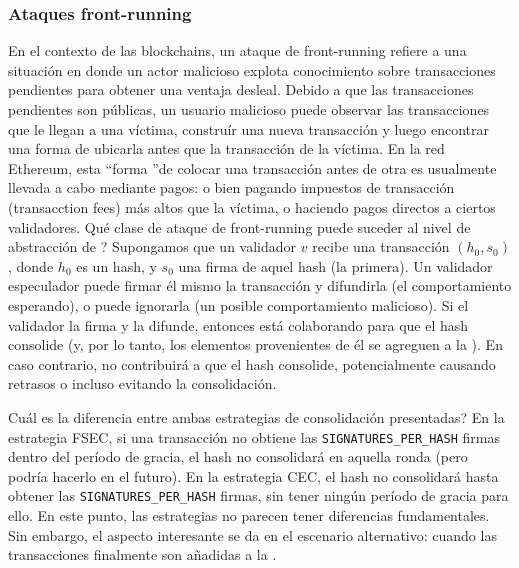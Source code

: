 \subsubsection{Ataques front-running}
En el contexto de las blockchains, un ataque de front-running refiere a una situación en donde
un actor malicioso explota conocimiento sobre transacciones pendientes para obtener una ventaja
desleal. Debido a que las transacciones pendientes son públicas, un usuario malicioso puede
observar las transacciones que le llegan a una víctima, construír una nueva transacción y luego
encontrar una forma de ubicarla antes que la transacción de la víctima. En la red Ethereum, esta
\textquotedblleft forma \textquotedblright de colocar una transacción antes de otra es usualmente
llevada a cabo mediante pagos: o bien pagando impuestos de transacción (transacction fees) más altos
que la víctima, o haciendo pagos directos a ciertos validadores.
%
Qué clase de ataque de front-running puede suceder al nivel de abstracción de \hashchain?
Supongamos que un validador $v$ recibe una transacción $(h_0, s_0)$, donde $h_0$ es un hash,
y $s_0$ una firma de aquel hash (la primera). Un validador especulador puede firmar él mismo la
transacción y difundirla (el comportamiento esperando), o puede ignorarla (un posible comportamiento
malicioso). Si el validador la firma y la difunde, entonces está colaborando para que el hash
consolide (y, por lo tanto, los elementos provenientes de él se agreguen a la  \hashchain).
En caso contrario, no contribuirá a que el hash consolide, potencialmente causando retrasos
o incluso evitando la consolidación.
%

Cuál es la diferencia entre ambas estrategias de consolidación presentadas?
%
En la estrategia FSEC, si una transacción no obtiene las \texttt{SIGNATURES\_PER\_HASH} firmas
dentro del período de gracia, el hash no consolidará en aquella ronda (pero podría hacerlo
en el futuro).
%
En la estrategia CEC, el hash no consolidará hasta obtener las \texttt{SIGNATURES\_PER\_HASH} firmas,
sin tener ningún período de gracia para ello.
%
En este punto, las estrategias no parecen tener diferencias fundamentales. Sin embargo, el aspecto
interesante se da en el escenario alternativo: cuando las transacciones finalmente son añadidas a la
\setchain.
%


